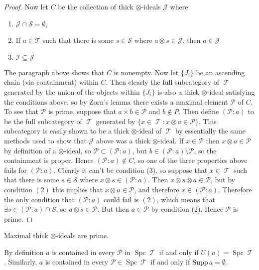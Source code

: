 \documentclass[11pt]{article}
\DeclareMathOperator{\TT}{\mathcal{T}}
\DeclareMathOperator{\spc}{Spc}
\begin{document}
\begin{proof}
Now let $C$ be the collection of thick $\otimes$-ideals $\mathcal{J}$ where 
\begin{enumerate}[(1)]
	\item $\mathcal{J} \cap \mathcal{S} = \emptyset$,
	\item If $a \in \mathcal{T}$ such that there is some $s \in \mathcal{S}$ where $a \otimes s \in \mathcal{J}$, then $a \in \mathcal{J}$
	\item $\mathcal{I} \subseteq \mathcal{J}$
\end{enumerate}
The paragraph above shows that $C$ is nonempty. Now let $\{J_i\}$ be an ascending chain (via containment) within $C$. Then clearly the full subcategory of $\TT$ generated by the union of the objects within $\{J_i\}$ is also a thick $\otimes$-ideal satisfying the conditions above, so by Zorn's lemma there exists a maximal element $\mathcal{P}$ of $C$. To see that $\mathcal{P}$ is prime, suppose that $a \times b \in \mathcal{P}$ and $b \not\in P$. Then define $(\mathcal{P}:a)$ to be the full subcategory of $\TT$ generated by $\{x \in \TT: x \otimes a \in \mathcal{P}\}$. This subcategory is easily shown to be a thick $\otimes$-ideal of $\TT$ by essentially the same methods used to show that $\mathcal{J}$ above was a thick $\otimes$-ideal. If $x \in \mathcal{P}$ then $x \otimes a \in \mathcal{P}$ by definition of a $\otimes$-ideal, so $\mathcal{P} \subset (\mathcal{P}: a)$, but $b \in (\mathcal{P}: a) \setminus \mathcal{P}$, so the containment is proper. Hence $(\mathcal{P}:a) \not\in C$, so one of the three properties above fails for $(\mathcal{P}:a)$. Clearly it can't be condition (3), so suppose that $x \in \TT$ such that there is some $s \in \mathcal{S}$ where $x \otimes s \in (\mathcal{P}: a)$. Then $x \otimes s \otimes a \in \mathcal{P}$, but by condition $(2)$ this implies that $x \otimes a \in \mathcal{P}$, and therefore $x \in (\mathcal{P}:a)$. Therefore the only condition that $(\mathcal{P}:a)$ could fail is $(2)$, which means that $\exists s \in (\mathcal{P}:a) \cap S$, so $a \otimes s \in \mathcal{P}$. But then $a \in \mathcal{P}$ by condition (2). Hence $\mathcal{P}$ is prime.
\end{proof}

\begin{cor}
Maximal thick $\otimes$-ideals are prime.
\end{cor}

By definition $a$ is contained in every $\mathcal{P}$ in $\spc \TT$ if and only if $U(a) = \spc \TT$. Similarly, $a$ is contained in every $\mathcal{P} \in \spc \TT$ if and only if $\operatorname{Supp} a = \emptyset$.
\end{document}
